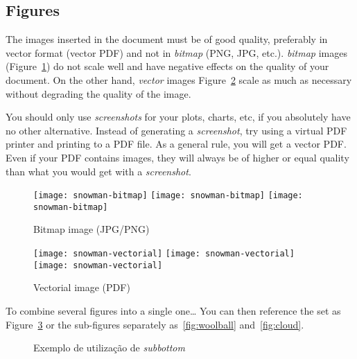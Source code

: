 \subsection{Figures} %

The images inserted in the document must be of good quality, preferably in vector format (vector PDF) and not in \emph{bitmap} (PNG, JPG, etc.). \emph{bitmap} images (Figure~\ref{fig:Figures_Tree_silhouettes-bitmap}) do not scale well and have negative effects on the quality of your document. On the other hand, \emph{vector} images {Figure~\ref{fig:Figures_Tree_silhouettes-vectorial}} scale as much as necessary without degrading the quality of the image.

You should only use \emph{screenshots} for your plots, charts, etc, if you absolutely have no other alternative. Instead of generating a \emph{screenshot}, try using a virtual PDF printer and printing to a PDF file. As a general rule, you will get a vector PDF. Even if your PDF contains images, they will always be of higher or equal quality than what you would get with a \emph{screenshot}.

\begin{figure}[htbp]
  \centering
  \texttt{[image: snowman-bitmap]}
  \texttt{[image: snowman-bitmap]}
  \texttt{[image: snowman-bitmap]}
  \caption{Bitmap image (JPG/PNG)}
  \label{fig:Figures_Tree_silhouettes-bitmap}
\end{figure}

\begin{figure}[htbp]
  \centering
  \texttt{[image: snowman-vectorial]}
  \texttt{[image: snowman-vectorial]}
  \texttt{[image: snowman-vectorial]}
  \caption{Vectorial image (PDF)}
  \label{fig:Figures_Tree_silhouettes-vectorial}
\end{figure}

To combine several figures into a single one… You can then reference the set as Figure~\ref{fig:complete-figure} or the sub-figures separately as~\ref{fig:woolball} and~\ref{fig:cloud}.

\begin{figure}[htbp]
  \centering
\qquad\qquad
  \caption{Exemplo de utilização de \emph{subbottom}}
  \label{fig:complete-figure}
\end{figure}

